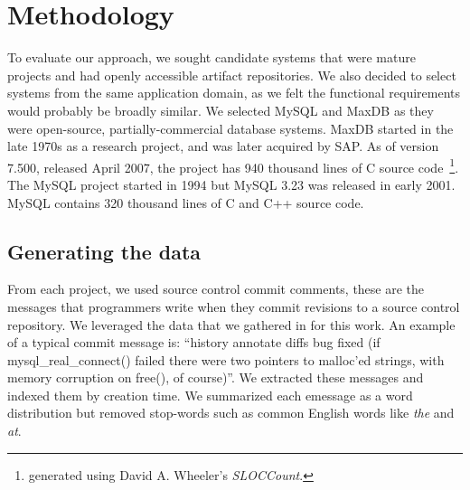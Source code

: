 \documentclass{acm_proc_article-sp}
\begin{document}
\section{Methodology}

To evaluate our approach, we sought candidate systems that were
mature projects and had openly accessible artifact repositories.
We also decided to select systems from the same application
domain, as we felt the functional requirements would probably be
broadly similar.
We selected MySQL and MaxDB as they were open-source, partially-commercial database systems. MaxDB started in the late 1970s as a research project, and was later acquired by SAP. As of version 7.500, released April 2007, the project has 940 thousand lines of C source code~\footnote{generated using David A. Wheeler's \emph{SLOCCount}.}.
The MySQL project started in 1994 but MySQL 3.23 was released in early 2001. MySQL contains 320 thousand lines of C and C++ source code. 

\subsection{Generating the data}
From each project, we used source control commit comments, these are the messages that programmers write when they commit revisions to a source control repository. We leveraged the data that we gathered in \cite{Hindle09ICSM} for this work. An example of a typical commit message is: ``history annotate diffs bug fixed (if mysql\_real\_connect() failed there were two pointers to malloc'ed strings, with memory corruption on free(), of course)''. We extracted these messages and indexed them by creation time. We summarized each emessage as a word distribution but removed stop-words such as   common English words like \emph{the} and \emph{at}.
\end{document}
